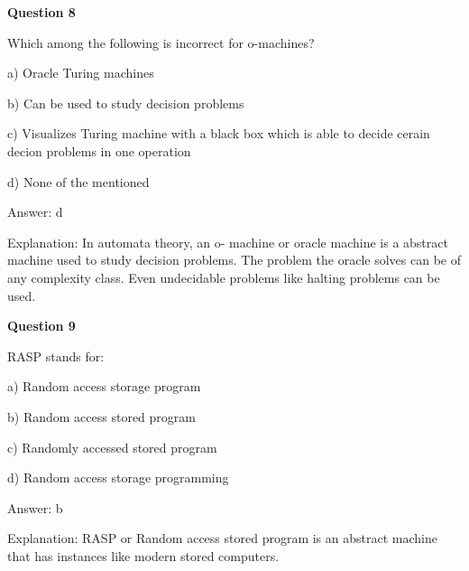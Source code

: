 \documentclass{article}
\begin{document}
\begin{mdframed}[linewidth=1pt, roundcorner=5pt, linecolor=gray!30, backgroundcolor=gray!5]
\textbf{Question 8} 

Which among the following is incorrect for o-machines?

a) Oracle Turing machines

b) Can be used to study decision problems

c) Visualizes Turing machine with a black box which is able to decide cerain decion problems in one operation

d) None of the mentioned
\vspace{5pt} \par
\begin{tcolorbox}[colback=green!5, colframe=green!40!black, title=Solution]
Answer: d

Explanation: In automata theory, an o- machine or oracle machine is a abstract machine used to study decision problems. The problem the oracle solves can be of any complexity class. Even undecidable problems like halting problems can be used.
\end{tcolorbox}
\end{mdframed}

\begin{mdframed}[linewidth=1pt, roundcorner=5pt, linecolor=gray!30, backgroundcolor=gray!5]
\textbf{Question 9} 

RASP stands for:

a) Random access storage program

b) Random access stored program

c) Randomly accessed stored program

d) Random access storage programming
\vspace{5pt} \par
\begin{tcolorbox}[colback=green!5, colframe=green!40!black, title=Solution]
Answer: b

Explanation: RASP or Random access stored program is an abstract machine that has instances like modern stored computers.
\end{tcolorbox}
\end{mdframed}
\newpage
\end{document}

